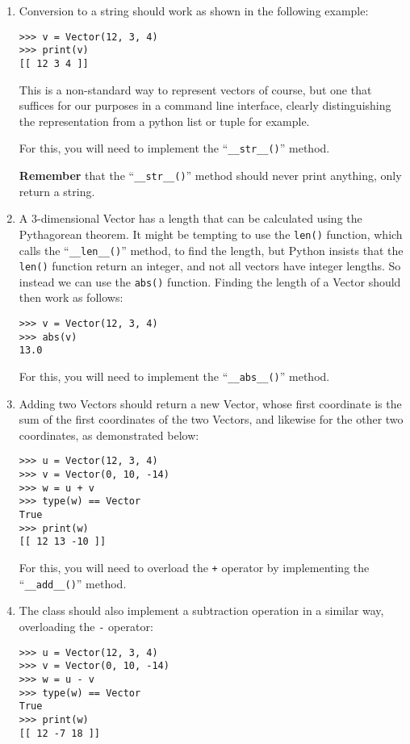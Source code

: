 \begin{enumerate}

\item
Conversion to a string should work as shown in the following example:
\begin{verbatim}
>>> v = Vector(12, 3, 4)
>>> print(v)
[[ 12 3 4 ]]
\end{verbatim}

This is a non-standard way to represent vectors of course,
but one that suffices for our purposes in a command line interface,
clearly distinguishing the representation from a python list or tuple for example.

For this, you will need to implement the ``\texttt{\_\_str\_\_()}'' method.

\textbf{Remember} that the ``\texttt{\_\_str\_\_()}'' method
should never print anything, only return a string.

\item
A $3$-dimensional Vector has a length
that can be calculated using the Pythagorean theorem.
It might be tempting to use the \texttt{len()} function,
which calls the ``\texttt{\_\_len\_\_()}'' method,
to find the length,
but Python insists that the \texttt{len()} function return an integer,
and not all vectors have integer lengths.
So instead we can use the \texttt{abs()} function.
Finding the length of a Vector should then work as follows:
\begin{verbatim}
>>> v = Vector(12, 3, 4)
>>> abs(v)
13.0
\end{verbatim}

For this, you will need to implement the ``\texttt{\_\_abs\_\_()}'' method.

\item
Adding two Vectors should return a new Vector,
whose first coordinate is the sum of the first coordinates of the two Vectors,
and likewise for the other two coordinates,
as demonstrated below:

\begin{verbatim}
>>> u = Vector(12, 3, 4)
>>> v = Vector(0, 10, -14)
>>> w = u + v
>>> type(w) == Vector
True
>>> print(w)
[[ 12 13 -10 ]]
\end{verbatim}

For this, you will need to overload the \texttt{+} operator
by implementing the ``\texttt{\_\_add\_\_()}'' method.

\item
The class should also implement a subtraction operation in a similar way,
overloading the \texttt{-} operator:
\begin{verbatim}
>>> u = Vector(12, 3, 4)
>>> v = Vector(0, 10, -14)
>>> w = u - v
>>> type(w) == Vector
True
>>> print(w)
[[ 12 -7 18 ]]
\end{verbatim}


\end{enumerate}
